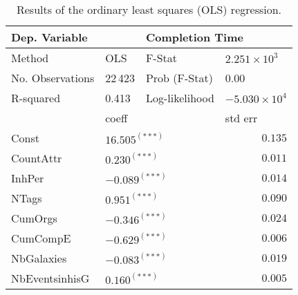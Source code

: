 \documentclass[unnumsec,webpdf,contemporary,large]{oup-authoring-template}%
\theoremstyle{thmstyleone}%
\theoremstyle{thmstyletwo}%
\theoremstyle{thmstylethree}%
\begin{document}
\begin{table}[ht]
\centering
\caption{Results of the ordinary least squares (OLS) regression.}
\begin{tabular}{lllr}
\hline
\multicolumn{2}{l|}{Dep. Variable}                 & \multicolumn{2}{l}{Completion Time}                                         \\ \hline
Method           & \multicolumn{1}{l|}{OLS}        & F-Stat             & \multicolumn{1}{l}{\hspace{0.29cm}$2.251 \times 10^3$} \\
No. Observations & \multicolumn{1}{l|}{22\,423}      & Prob (F-Stat)      & \multicolumn{1}{l}{\hspace{0.29cm}0.00}                \\
R-squared        & \multicolumn{1}{l|}{0.413}      & Log-likelihood     & \multicolumn{1}{l}{$-5.030 \times 10^4$}               \\ \hline
                 & \multicolumn{2}{l}{coeff}                            & \multicolumn{1}{l}{std err}                            \\ \hline
Const            & \multicolumn{2}{l}{\hspace{0.1cm}$16.505^{(***)}$}  & $0.135$                                                \\
CountAttr        & \multicolumn{2}{l}{\hspace{0.25cm}$0.230^{(***)}$}   & $0.011$                                                \\
InhPer           & \multicolumn{2}{l}{${-0.089}^{(***)}$}               & $0.014$                                                \\
NTags            & \multicolumn{2}{l}{\hspace{0.25cm}${0.951}^{(***)}$} & $0.090$                                                \\
CumOrgs          & \multicolumn{2}{l}{${-0.346}^{(***)}$}               & $0.024$                                                \\
CumCompE         & \multicolumn{2}{l}{${-0.629}^{(***)}$}               & $0.006$                                                \\
NbGalaxies       & \multicolumn{2}{l}{${-0.083}^{(***)}$}               & $0.019$                                                \\
NbEventsinhisG  & \multicolumn{2}{l}{\hspace{0.25cm}${0.160}^{(***)}$} & $0.005$                                                \\ \hline

\end{tabular}
\end{table}
\end{document}
